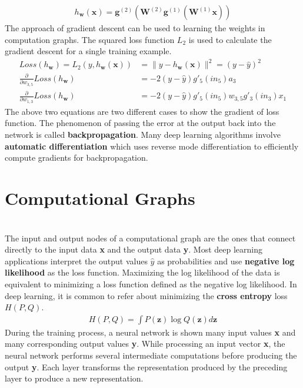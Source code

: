 \documentclass{article}
\begin{document}
\begin{paragraph}
\begin{align*}
    h_\textbf{w}(\textbf{x}) = \textbf{g}^{(2)}(\textbf{W}^{(2)}\textbf{g}^{(1)}(\textbf{W}^{(1)}\textbf{x}))
\end{align*}
The approach of gradient descent can be used to learning the weights in computation graphs. The squared loss function $L_2$ is used to calculate the gradient descent for a single training example. 
\begin{align*}
    Loss(h_\textbf{w}) = L_2(y,h_\textbf{w}(\textbf{x})) & = \lVert y - h_\textbf{w}(\textbf{x}) \rVert^2 = (y - \hat{y})^2 \\
    \frac{\partial}{\partial w_{3,5}}Loss(h_\textbf{w}) & = -2(y-\hat{y})g'_5(in_5)a_3 \\
     \frac{\partial}{\partial w_{1,3}}Loss(h_\textbf{w}) & = -2(y-\hat{y})g'_5(in_5)w_{3,5}g'_3(in_3)x_1
\end{align*}
The above two equations are two different cases to show the gradient of loss function. The phenomenon of passing the error at the output back into the network is called \textbf{backpropagation}. Many deep learning algorithms involve \textbf{automatic differentiation} which uses reverse mode differentiation to efficiently compute gradients for backpropagation.
\end{paragraph}
\section{Computational Graphs}
\begin{paragraph}
\\
The input and output nodes of a computational graph are the ones that connect directly to the input data \textbf{x} and the output data \textbf{y}. Most deep learning applications interpret the output values $\hat{y}$ as probabilities and use \textbf{negative log likelihood} as the loss function. Maximizing the log likelihood of the data is equivalent to minimizing a loss function defined as the negative log likelihood. In deep learning, it is common to refer about minimizing the \textbf{cross entropy} loss $H(P,Q)$.
\begin{align*}
    H(P,Q) = \int P(\textbf{z})\log Q(\textbf{z})d\textbf{z}
\end{align*}
During the training process, a neural network is shown many input values \textbf{x} and many corresponding output values \textbf{y}. While processing an input vector \textbf{x}, the neural network performs several intermediate computations before producing the output \textbf{y}. Each layer transforms the representation produced by the preceding layer to produce a new representation.
\end{paragraph}
\end{document}
